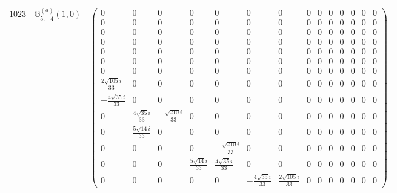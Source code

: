 \documentclass[fleqn,8pt,landscape]{jsarticle}
\begin{document}
\begin{center}
\begin{longtable}{ccc}
$ 1023 $ & $ \mathbb{G}_{5,-4}^{(a)}(1,0) $ & $ \begin{pmatrix} 0 & 0 & 0 & 0 & 0 & 0 & 0 & 0 & 0 & 0 & 0 & 0 & 0 & 0 \\ 0 & 0 & 0 & 0 & 0 & 0 & 0 & 0 & 0 & 0 & 0 & 0 & 0 & 0 \\ 0 & 0 & 0 & 0 & 0 & 0 & 0 & 0 & 0 & 0 & 0 & 0 & 0 & 0 \\ 0 & 0 & 0 & 0 & 0 & 0 & 0 & 0 & 0 & 0 & 0 & 0 & 0 & 0 \\ 0 & 0 & 0 & 0 & 0 & 0 & 0 & 0 & 0 & 0 & 0 & 0 & 0 & 0 \\ 0 & 0 & 0 & 0 & 0 & 0 & 0 & 0 & 0 & 0 & 0 & 0 & 0 & 0 \\ 0 & 0 & 0 & 0 & 0 & 0 & 0 & 0 & 0 & 0 & 0 & 0 & 0 & 0 \\ \frac{2 \sqrt{105} i}{33} & 0 & 0 & 0 & 0 & 0 & 0 & 0 & 0 & 0 & 0 & 0 & 0 & 0 \\ - \frac{4 \sqrt{35} i}{33} & 0 & 0 & 0 & 0 & 0 & 0 & 0 & 0 & 0 & 0 & 0 & 0 & 0 \\ 0 & \frac{4 \sqrt{35} i}{33} & - \frac{\sqrt{210} i}{33} & 0 & 0 & 0 & 0 & 0 & 0 & 0 & 0 & 0 & 0 & 0 \\ 0 & \frac{5 \sqrt{14} i}{33} & 0 & 0 & 0 & 0 & 0 & 0 & 0 & 0 & 0 & 0 & 0 & 0 \\ 0 & 0 & 0 & 0 & - \frac{\sqrt{210} i}{33} & 0 & 0 & 0 & 0 & 0 & 0 & 0 & 0 & 0 \\ 0 & 0 & 0 & \frac{5 \sqrt{14} i}{33} & \frac{4 \sqrt{35} i}{33} & 0 & 0 & 0 & 0 & 0 & 0 & 0 & 0 & 0 \\ 0 & 0 & 0 & 0 & 0 & - \frac{4 \sqrt{35} i}{33} & \frac{2 \sqrt{105} i}{33} & 0 & 0 & 0 & 0 & 0 & 0 & 0 \end{pmatrix} $ \\ \hline

\end{longtable}
\end{center}
\end{document}
